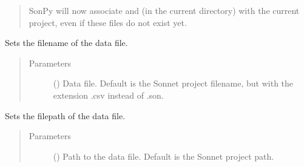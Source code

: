 \documentclass[letterpaper,10pt,english,openany]{sphinxmanual}
\begin{document}
\begin{fulllineitems}
\begin{fulllineitems}
\begin{quote}
\begin{description}
SonPy will now associate  and  (in the current directory) with the current project, even if these files do not exist yet.

\end{description}\end{quote}

\end{fulllineitems}


\begin{fulllineitems}
\label{\detokenize{source/sonpy:sonpy.sonnet.setDataFile}}
Sets the filename of the data file.
\begin{quote}\begin{description}
\item[{Parameters}] \leavevmode
{} () \textendash{} Data file. Default is the Sonnet project filename, but with the extension .csv instead of .son.

\end{description}\end{quote}

\end{fulllineitems}


\begin{fulllineitems}
\label{\detokenize{source/sonpy:sonpy.sonnet.setDataFilePath}}
Sets the filepath of the data file.
\begin{quote}\begin{description}
\item[{Parameters}] \leavevmode
{} () \textendash{} Path to the data file. Default is the Sonnet project path.

\end{description}\end{quote}

\end{fulllineitems}



\end{fulllineitems}
\end{document}
